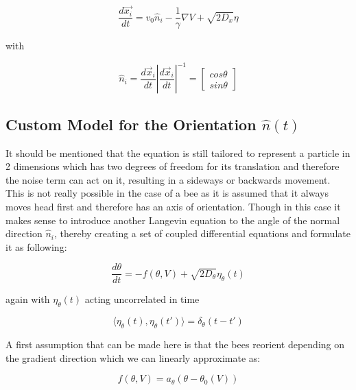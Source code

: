 \begin{equation}
\label{eq:Langevin_reduce}
\boxed{
    \frac{d \vec{x_{i}}}{d t} = v_{0} \hat{n}_{i} - \frac{1}{\gamma} \nabla V + \sqrt{2 D_{x}}\eta
    }
\end{equation}

with

\begin{equation}
\label{eq:vector_n}
    \hat{n}_{i} = \frac{d\vec{x}_{i}}{dt} \left|\frac{d\vec{x}_{i}}{dt}\right|^{-1} = 
    \begin{bmatrix}
    cos\theta \\ sin\theta
    \end{bmatrix}
\end{equation}


\subsection{Custom Model for the Orientation $\hat{n}(t)$}

It should be mentioned that the equation is still tailored to represent a particle in 2 dimensions which has two degrees of freedom for its translation and therefore the noise term can act on it, resulting in a sideways or backwards movement. This is not really possible in the case of a bee as it is assumed that it always moves head first and therefore has an axis of orientation.
Though in this case it makes sense to introduce another Langevin equation to the angle of the normal direction $\hat{n}_{i}$, thereby creating a set of coupled differential equations and formulate it as following:

\begin{equation}
\label{eq:Langevin_theta}
    \frac{d \theta}{dt} = - f(\theta, V) + \sqrt{2D_{\theta}}\eta_{\theta}(t)
\end{equation}

again with $\eta_{\theta}(t)$ acting uncorrelated in time

\begin{equation}
\label{eq:noise_theta}
    \langle \eta_{\theta}(t), \eta_{\theta}(t') \rangle = \delta_{\theta} (t - t')
\end{equation}

A first assumption that can be made here is that the bees reorient depending on the gradient direction which we can linearly approximate as:

\begin{equation}
\label{eq:angle_approx}
    f(\theta, V) = a_{\theta} (\theta - \theta_{0}(V))
\end{equation}

